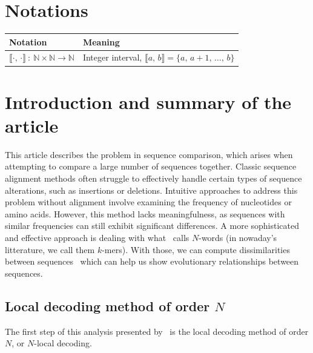 \documentclass[english,13pt,a4paper]{article}
\theoremstyle{definition}
\theoremstyle{remark}
\theoremstyle{defstyle}
\newcommand{\I}[1]{\mathbb{#1}}
\begin{document}



\normalsize
\tableofcontents

\newpage

\section*{Notations}\label{sec:notation}

\begin{table}[h!]
    \centering
    \begin{tabular}{p{5cm} p{13cm}}
        \hline
        Notation & Meaning\\
        \hline
        $\llbracket \cdot, \, \cdot \rrbracket \: : \: \I N \times \I N \to \I N$ & Integer interval, $\llbracket a, \, b \rrbracket = \{a, \, a+1, \, \ldots, \, b\}$
    \end{tabular}
\end{table}

\section{Introduction and summary of the article}\label{seq:summary}

This article describes the problem in sequence comparison, which arises when attempting to compare a large number of sequences together. Classic sequence alignment methods often struggle to effectively handle certain types of sequence alterations, such as insertions or deletions. Intuitive approaches to address this problem without alignment involve examining the frequency of nucleotides or amino acids. However, this method lacks meaningfulness, as sequences with similar frequencies can still exhibit significant differences. A more sophisticated and effective approach is dealing with what~\cite{didier_comparing_2007} calls $N$-words (in nowaday's litterature, we call them $k$-mers). With those, we can compute dissimilarities between sequences~\cite{karlin1994comparisons} which can help us show evolutionary relationships between sequences.\\

\subsection{Local decoding method of order $N$}

The first step of this analysis presented by~\cite{didier_comparing_2007} is the local decoding method of order $N$, or $N$-local decoding. \\
\end{document}
